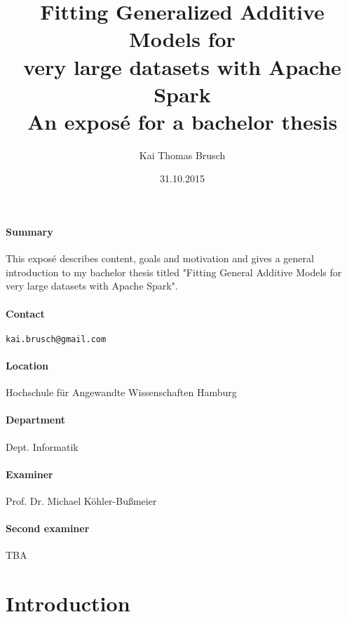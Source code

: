 \documentclass{article}
\title{
    Fitting Generalized Additive Models for\\ very large datasets with Apache Spark \\[7pt]
    \large An exposé for a bachelor thesis
}
\date{31.10.2015}
\author{Kai Thomas Brusch}
\begin{document}

    \maketitle

    \paragraph{Summary}

    This exposé describes content, goals and motivation and gives a general introduction to my bachelor thesis titled "Fitting General Additive Models for very large datasets with Apache Spark".

    \paragraph{Contact} \texttt{kai.brusch@gmail.com}

    \paragraph{Location} Hochschule für Angewandte Wissenschaften Hamburg
    \paragraph{Department} Dept. Informatik
    \paragraph{Examiner} Prof. Dr. Michael Köhler-Bußmeier
    \paragraph{Second examiner} TBA

    \newpage

    \tableofcontents

    \newpage

    \section{Introduction}
\end{document}
